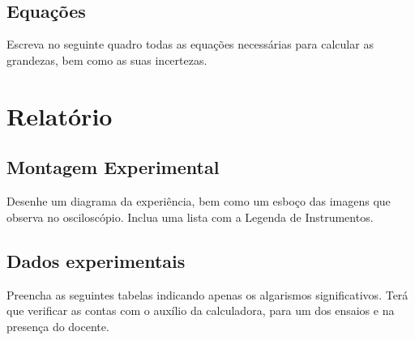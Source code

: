 \documentclass[a4paper,12pt]{article}  %
\begin{document}
\noindent\underline{\makebox[\textwidth][r]{~}} \\
\noindent\underline{\makebox[\textwidth][r]{~}} \\
\noindent\underline{\makebox[\textwidth][r]{~}} \\
\noindent\underline{\makebox[\textwidth][r]{~}} \\
\noindent\underline{\makebox[\textwidth][r]{~}} \\
\noindent\underline{\makebox[\textwidth][r]{~}} \\
\noindent\underline{\makebox[\textwidth][r]{~}} \\




\subsection{\sf Equações }
Escreva no seguinte quadro todas as equações necessárias para calcular as grandezas, bem como as suas incertezas.
\begin{center}
\framebox[15cm]{\rule{0pt}{8.5cm}}
\end{center}

\newpage
\section{\sf Relatório}
\subsection{\sf Montagem Experimental}
Desenhe um diagrama da experiência, bem como um esboço das imagens que observa no osciloscópio. Inclua uma lista com a Legenda de Instrumentos.

\begin{center}
\framebox[18cm]{\rule{0pt}{6.5cm}}
\end{center}

\subsection{\sf Dados experimentais}%
Preencha as seguintes tabelas indicando  apenas os algarismos significativos. 
Terá que verificar as contas com o auxílio da calculadora, para um dos ensaios e na presença do docente.
\end{document}
